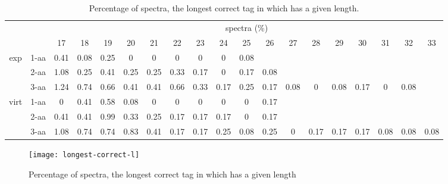 \documentclass{article}[12pt]
\begin{document}
\begin{landscape}
\begin{table}[h]\tiny
\vspace{3mm}
{\centering
\begin{center}
\begin{tabular}{|c|l|c|c|c|c|c|c|c|c|c|c|c|c|c|c|c|c|c|}
  \hline
  \multicolumn{2}{|c|}{ } & \multicolumn{ 17 }{|c|}{ spectra (\%)} \\
  \cline{3- 19}
  \multicolumn{2}{|c|}{ }  & 17 & 18 & 19 & 20 & 21 & 22 & 23 & 24 & 25 & 26 & 27 & 28 & 29 & 30 & 31 & 32 & 33\\
  \hline
  \multirow{3}{*}{exp}
&  1-aa  & 0.41 & 0.08 & 0.25 & 0 & 0 & 0 & 0 & 0 & 0.08 &  &  &  &  &  &  &  & \\
&  2-aa  & 1.08 & 0.25 & 0.41 & 0.25 & 0.25 & 0.33 & 0.17 & 0 & 0.17 & 0.08 &  &  &  &  &  &  & \\
&  3-aa  & 1.24 & 0.74 & 0.66 & 0.41 & 0.41 & 0.66 & 0.33 & 0.17 & 0.25 & 0.17 & 0.08 & 0 & 0.08 & 0.17 & 0 & 0.08 & \\
 \hline
  \multirow{3}{*}{virt} 
&  1-aa  & 0 & 0.41 & 0.58 & 0.08 & 0 & 0 & 0 & 0 & 0 & 0.17 &  &  &  &  &  &  & \\
&  2-aa  & 0.41 & 0.41 & 0.99 & 0.33 & 0.25 & 0.17 & 0.17 & 0.17 & 0 & 0.17 &  &  &  &  &  &  & \\
&  3-aa  & 1.08 & 0.74 & 0.74 & 0.83 & 0.41 & 0.17 & 0.17 & 0.25 & 0.08 & 0.25 & 0 & 0.17 & 0.17 & 0.17 & 0.08 & 0.08 & 0.08\\
 \hline
\end{tabular}
\end{center}
\par}
\centering
\caption{ Percentage of spectra, the longest correct tag in which has a given length.}
\label{table:longest-correct-l}
\vspace{3mm}
\end{table}

\end{landscape}

\begin{figure}
  \begin{center}
\texttt{[image: longest-correct-l]}
\end{center}
\caption{Percentage of spectra, the longest correct tag in which has a given length}
  \label{fig:longest-correct-l}
\end{figure}
\end{document}
